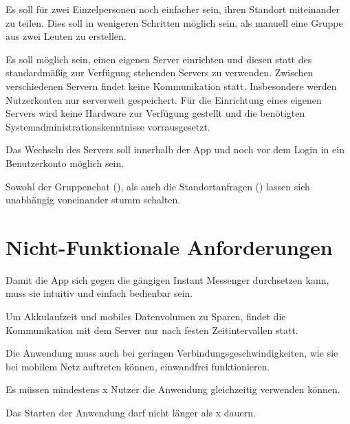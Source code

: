 \documentclass[parskip=full,11pt]{scrartcl}
\begin{document}
Es soll für zwei Einzelpersonen noch einfacher sein, ihren Standort miteinander
zu teilen. Dies soll in wenigeren Schritten möglich sein, als manuell eine
Gruppe aus zwei Leuten zu erstellen.

Es soll möglich sein, einen eigenen Server einrichten und diesen statt des
standardmäßig zur Verfügung stehenden Servers zu verwenden.
Zwischen verschiedenen Servern findet keine Kommunikation statt.
Insbesondere werden Nutzerkonten nur serverweit gespeichert.
Für die Einrichtung eines eigenen Servers wird keine Hardware zur Verfügung
gestellt und die benötigten Systemadministrationskenntnisse vorrausgesetzt.

Das Wechseln des Servers soll innerhalb der App und noch vor dem Login in ein
Benutzerkonto möglich sein.

Sowohl der Gruppenchat (),
als auch die Standortanfragen () lassen
sich unabhängig voneinander stumm schalten.


\section{Nicht-Funktionale Anforderungen}

Damit die App sich gegen die gängigen Instant Messenger durchsetzen kann, muss sie intuitiv und einfach bedienbar sein.

Um Akkulaufzeit und mobiles Datenvolumen zu Sparen, findet die Kommunikation mit dem Server nur nach festen Zeitintervallen statt.

Die Anwendung muss auch bei geringen Verbindungsgeschwindigkeiten, wie sie bei mobilem Netz auftreten können, einwandfrei funktionieren.

Es müssen mindestens x Nutzer die Anwendung gleichzeitig verwenden können.  %

Das Starten der Anwendung darf nicht länger als x dauern.   %
\end{document}
